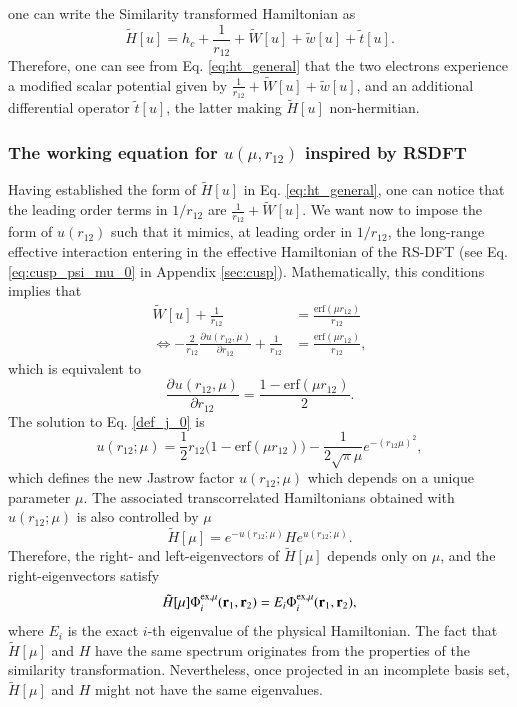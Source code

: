 \documentclass[aip,jcp,reprint,noshowkeys,superscriptaddress]{revtex4-1}
\newcommand{\deriv}[3]{\frac{\partial^{#3} #1}{\partial {#2}^{#3}}}
\newcommand{\br}[0]{{\bf {r}}}
\newcommand{\phimui}[0]{\Phi^{\text{ex},\mu}_i}
\begin{document}
one can write the Similarity transformed Hamiltonian  as
\begin{equation}
 \label{eq:ht_general}
 \tilde{H}[u] = h_c + \frac{1}{r_{12}}  + \tilde{W}[u] + \tilde{w}[u] + \tilde{t}[u].
\end{equation}
Therefore, one can see from Eq. \eqref{eq:ht_general} that the two electrons experience a modified scalar potential given by $\frac{1}{r_{12}}  + \tilde{W}[u] + \tilde{w}[u]$, and an additional differential operator $\tilde{t}[u]$, 
the latter making $\tilde{H}[u]$ non-hermitian. 

\subsubsection{The working equation for $u(\mu,r_{12})$ inspired by RSDFT}
Having established the form of $\tilde{H}[u] $ in Eq. \eqref{eq:ht_general}, one can notice that the leading order terms in $1/r_{12}$ are $\frac{1}{r_{12}}  + \tilde{W}[u]$. We want now to impose the form of $u(r_{12})$ such that it mimics, at leading order in $1/r_{12}$, the long-range effective interaction entering in the effective Hamiltonian of the RS-DFT (see Eq. \eqref{eq:cusp_psi_mu_0} in Appendix \ref{sec:cusp}). 
Mathematically, this conditions implies that 
\begin{equation}
 \begin{aligned}
 \label{def_j_00}
 \tilde{W}[u] + \frac{1}{r_{12}}&= \frac{\text{erf}(\mu r_{12})}{r_{12}} \\ 
\Leftrightarrow -\frac{2}{r_{12}} \deriv{u(r_{12},\mu)}{r_{12}}{} + \frac{1}{r_{12}} & = \frac{\text{erf}(\mu r_{12})}{r_{12}}, 
 \end{aligned}
\end{equation}
which is equivalent to 
\begin{equation}
 \label{def_j_0}
 \deriv{u(r_{12},\mu)}{r_{12}}{} = \frac{1 - \text{erf}(\mu r_{12})}{2}.
\end{equation}
The solution to Eq. \eqref{def_j_0} is 
\begin{equation}
 \label{eq:def_j}
 u(r_{12};\mu) = \frac{1}{2}r_{12}\bigg( 1 - \text{erf}(\mu r_{12})  \bigg) - \frac{1}{2\sqrt{\pi}\mu}e^{-(r_{12}\mu)^2},
\end{equation}
which defines the new Jastrow factor $u(r_{12};\mu)$ which depends on a unique parameter $\mu$.  
The associated transcorrelated Hamiltonians obtained with $u(r_{12};\mu)$ is also controlled by $\mu$
\begin{equation}
 \label{eq:def_ht_mu}
 \tilde{H}[\mu] = e^{-u(r_{12};\mu)} H e^{u(r_{12};\mu)}. 
\end{equation}
Therefore, the right- and left-eigenvectors of $\tilde{H}[\mu]$ depends only on $\mu$, and the right-eigenvectors satisfy 
\begin{equation}
 \tilde{H}[\mu] \phimui(\br{}_{1},\br{}_{2}) = E_i \phimui(\br{}_{1},\br{}_{2}), 
\end{equation}
where $E_i$ is the exact $i$-th eigenvalue of the physical Hamiltonian. The fact that $\tilde{H}[\mu]$ and $H$ have the same spectrum originates from the properties of the similarity transformation. Nevertheless, once projected in an incomplete basis set, $\tilde{H}[\mu]$ and $H$ might not have the same eigenvalues. 
\end{document}
